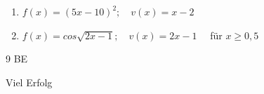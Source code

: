 \documentclass[a4paper,12pt]{article}
\begin{document}
\begin{enumerate}[label={\alph*)}]
  \item $f(x)=(5x-10)^2; \quad v(x)=x-2$
  \item $f(x)=cos\sqrt{2x-1}; \quad v(x)=2x-1  \quad  $ für $x \geq 0,5$ 
\end{enumerate}

\begin{flushright} 9 BE \end{flushright}
\vspace{0,8cm}


\centerline{Viel Erfolg}









\end{document}
